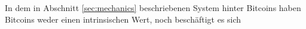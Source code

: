 In dem in Abschnitt \ref{sec:mechanics} beschriebenen System hinter Bitcoins haben Bitcoins weder einen intrinsischen Wert, noch beschäftigt es sich
